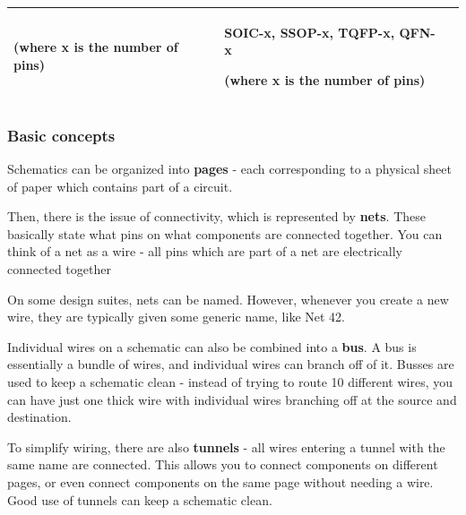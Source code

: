 \documentclass[letterpaper]{article}
\begin{document}
\begin{flushleft}
\begin{supertabular}{|m{2.4254599in}|m{2.4226599in}|m{2.4226599in}|}
{\sffamily\color[rgb]{0.30980393,0.5058824,0.7411765} (where x is the number of pins)} &
{\sffamily\color[rgb]{0.30980393,0.5058824,0.7411765} SOIC-x, SSOP-x, TQFP-x, QFN-x}

{\sffamily\color[rgb]{0.30980393,0.5058824,0.7411765} (where x is the number of pins)}\\\hline
\end{supertabular}
\end{flushleft}

\bigskip

\clearpage
\bigskip

\subsubsection{Basic concepts}
\hypertarget{Toc337742679}{}{\sffamily\color[rgb]{0.30980393,0.5058824,0.7411765}
Schematics can be organized into \textbf{pages} - each corresponding to a physical sheet of paper which contains part of
a circuit.}

{\sffamily\color[rgb]{0.30980393,0.5058824,0.7411765}
Then, there is the issue of connectivity, which is represented by \textbf{nets}. These basically state what pins on what
components are connected together. You can think of a net as a wire - all pins which are part of a net are electrically
connected together}

{\sffamily\color[rgb]{0.30980393,0.5058824,0.7411765}
On some design suites, nets can be named. However, whenever you create a new wire, they are typically given some generic
name, like {\textquotedbl}Net 42.{\textquotedbl}}

{\sffamily\color[rgb]{0.30980393,0.5058824,0.7411765}
Individual wires on a schematic can also be combined into a \textbf{bus}. A bus is essentially a bundle of wires, and
individual wires can branch off of it. Busses are used to keep a schematic clean - instead of trying to route 10
different wires, you can have just one thick wire with individual wires branching off at the source and destination.}


\bigskip

{\sffamily\color[rgb]{0.30980393,0.5058824,0.7411765}
To simplify wiring, there are also \textbf{tunnels} - all wires entering a tunnel with the same name are connected. This
allows you to connect components on different pages, or even connect components on the same page without needing a
wire. Good use of tunnels can keep a schematic clean.}
\end{document}
